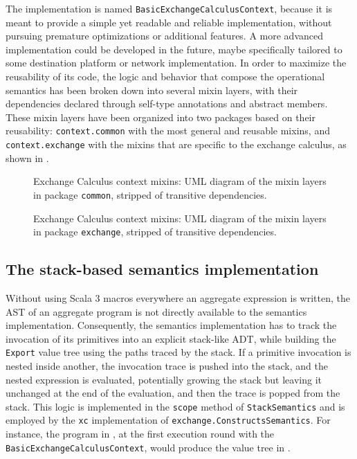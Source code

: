 The implementation is named \texttt{BasicExchangeCalculusContext}, because it is meant to provide a simple yet readable and reliable implementation, without pursuing premature optimizations or additional features.
%
A more advanced implementation could be developed in the future, maybe specifically tailored to some destination platform or network implementation.
%
In order to maximize the reusability of its code, the logic and behavior that compose the operational semantics has been broken down into several mixin layers, with their dependencies declared through self-type annotations and abstract members.
%
These mixin layers have been organized into two packages based on their reusability: \texttt{context.common} with the most general and reusable mixins, and \texttt{context.exchange} with the mixins that are specific to the exchange calculus, as shown in .

\begin{figure}
    \centering
    \caption{Exchange Calculus context mixins: \ac{UML} diagram of the mixin layers in package \texttt{common}, stripped of transitive dependencies.}
    \label{fig:context-mixins-common}
    \bigskip
    \resizebox{\linewidth}{!}{
        
    }
\end{figure}

\begin{figure}
    \centering
    \caption{Exchange Calculus context mixins: \ac{UML} diagram of the mixin layers in package \texttt{exchange}, stripped of transitive dependencies.}
    \label{fig:context-mixins-exchange}
    \bigskip
    \resizebox{\linewidth}{!}{
        
    }
\end{figure}


\subsection{The stack-based semantics implementation}

Without using Scala 3 macros everywhere an aggregate expression is written, the \ac{AST} of an aggregate program is not directly available to the semantics implementation.
%
Consequently, the semantics implementation has to track the invocation of its primitives into an explicit stack-like \ac{ADT}, while building the \texttt{Export} value tree using the paths traced by the stack.
%
If a primitive invocation is nested inside another, the invocation trace is pushed into the stack, and the nested expression is evaluated, potentially growing the stack but leaving it unchanged at the end of the evaluation, and then the trace is popped from the stack.
%
This logic is implemented in the \texttt{scope} method of \texttt{StackSemantics} and is employed by the \texttt{xc} implementation of \texttt{exchange.ConstructsSemantics}.
%
For instance, the program in , at the first execution round with the \texttt{BasicExchangeCalculusContext}, would produce the value tree in .

